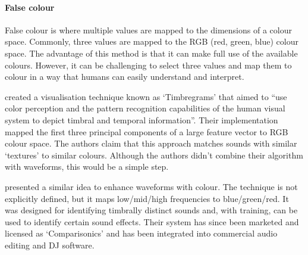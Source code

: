 \paragraph{False colour}\label{sec:background-falsecolour}
False colour is where multiple values are mapped to the dimensions of a colour space. Commonly, three values are
mapped to the RGB (red, green, blue) colour space.  The advantage of this method is that it can make full use of the
available colours.  However, it can be challenging to select three values and map them to colour in a way that humans
can easily understand and interpret.

\citet{Tzanetakis2000} created a visualisation technique known as `Timbregrams' that aimed to ``use color perception
and the pattern recognition capabilities of the human visual system to depict timbral and temporal information''. Their
implementation mapped the first three principal components of a large feature vector to RGB colour space. The authors
claim that this approach matches sounds with similar `textures' to similar colours.
Although the authors didn't combine their algorithm with waveforms, this would be a simple step.

\citet{Rice2005} presented a similar idea to enhance waveforms with colour. The technique is not
explicitly defined, but it maps low/mid/high frequencies to blue/green/red. It was designed for identifying
timbrally distinct sounds and, with training, can be used to identify certain sound effects. Their system has since
been marketed and licensed as `Comparisonics' and has been integrated into commercial audio editing and DJ
software.

